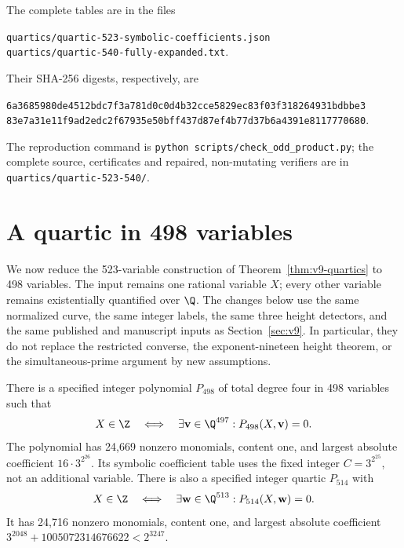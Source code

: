 The complete tables are in the files
\begin{center}\small
\nolinkurl{quartics/quartic-523-symbolic-coefficients.json}\\
\nolinkurl{quartics/quartic-540-fully-expanded.txt}.
\end{center}
Their SHA-256 digests, respectively, are
\begin{center}\small
\nolinkurl{6a3685980de4512bdc7f3a781d0c0d4b32cce5829ec83f03f318264931bdbbe3}\\
\nolinkurl{83e7a31e11f9ad2edc2f67935e50bff437d87ef4b77d37b6a4391e8117770680}.
\end{center}
The reproduction command is
\nolinkurl{python scripts/check_odd_product.py}; the complete source,
certificates and repaired, non-mutating verifiers are in
\nolinkurl{quartics/quartic-523-540/}.


\section{A quartic in 498 variables}\label{sec:v12}

We now reduce the 523-variable construction of
Theorem~\ref{thm:v9-quartics} to 498 variables.  The input remains one
rational variable $X$; every other variable remains existentially
quantified over $\Q$.  The changes below use the same normalized curve,
the same integer labels, the same three height detectors, and the same
published and manuscript inputs as Section~\ref{sec:v9}.  In particular,
they do not replace the restricted converse, the exponent-nineteen
height theorem, or the simultaneous-prime argument by new assumptions.

\begin{theorem}\label{thm:v12-quartic}
There is a specified integer polynomial $P_{498}$ of total degree four
in 498 variables such that
\[
 X\in\Z\quad\Longleftrightarrow\quad
 \exists\mathbf v\in\Q^{497}:P_{498}(X,\mathbf v)=0.
\]
The polynomial has 24,669 nonzero monomials, content one, and largest
absolute coefficient $16\cdot3^{2^{26}}$.  Its symbolic coefficient
table uses the fixed integer $C=3^{2^{25}}$, not an additional variable.
There is also a specified integer quartic $P_{514}$ with
\[
 X\in\Z\quad\Longleftrightarrow\quad
 \exists\mathbf w\in\Q^{513}:P_{514}(X,\mathbf w)=0.
\]
It has 24,716 nonzero monomials, content one, and largest absolute
coefficient $3^{2048}+1005072314676622<2^{3247}$.
\end{theorem}

